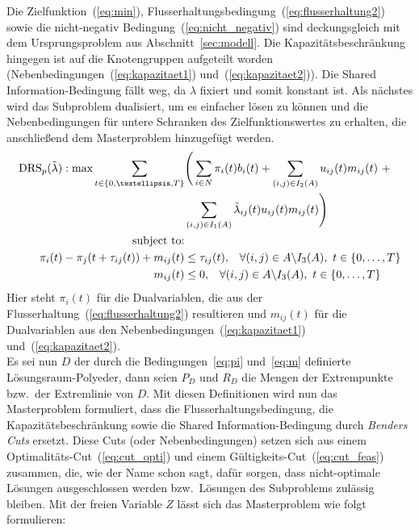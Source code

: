 \documentclass[a4paper, 11pt]{scrreprt}
\begin{document}
Die Zielfunktion~(\ref{eq:min}), Flusserhaltungsbedingung~(\ref{eq:flusserhaltung2}) sowie
die nicht-negativ Bedingung~(\ref{eq:nicht_negativ}) sind
deckungsgleich mit dem Ursprungsproblem aus Abschnitt~\ref{sec:modell}.
Die Kapazitätsbeschränkung hingegen ist auf die Knotengruppen aufgeteilt worden
(Nebenbedingungen~(\ref{eq:kapazitaet1}) und~(\ref{eq:kapazitaet2})).
Die Shared Information-Bedingung fällt weg, da $\lambda$ fixiert und somit konstant ist.
Als nächstes wird das Subproblem dualisiert, um es einfacher lösen zu können und die
Nebenbedingungen für untere Schranken des Zielfunktionswertes zu erhalten, die anschließend dem
Masterproblem hinzugefügt werden.
\begin{align}
  \text{DRS}_p(\tilde{\lambda}):\text{max} \sum_{t \in \{0,…,T\}}&\Bigg(\sum_{i \in N}\pi_i(t)b_i(t) + \sum_{(i,j)\in I_2(A)}u_{ij}(t)m_{ij}(t) \,\,+\notag\\ &\sum_{(i,j)\in I_1(A)} \tilde{\lambda}_{ij}(t) u_{ij}(t) m_{ij}(t)\Bigg)\\
  \text{subject to:}&\notag\\
  \pi_i(t) - \pi_j(t + \tau_{ij}(t)) + m_{ij}(t) &\leq \tau_{ij}(t), \,\,\,\,\, \forall (i, j) \in A \backslash I_3(A), \,\, t \in \{0,\dots,T\}\label{eq:pi}\\
  m_{ij}(t) &\leq 0, \,\,\,\,\, \forall (i, j) \in A \backslash I_3(A), \,\, t \in \{0,\dots,T\}\label{eq:m}
\end{align}
Hier steht $\pi_i(t)$ für die Dualvariablen, die aus der Flusserhaltung~(\ref{eq:flusserhaltung2}) resultieren
und $m_{ij}(t)$ für die Dualvariablen aus den Nebenbedingungen~(\ref{eq:kapazitaet1}) und~(\ref{eq:kapazitaet2}).\\
Es sei nun $D$ der durch die Bedingungen~\ref{eq:pi} und~\ref{eq:m} definierte Lösungsraum-Polyeder, dann
seien $P_D$ und $R_D$ die Mengen der Extrempunkte bzw.\ der Extremlinie von $D$.
Mit diesen Definitionen wird nun das Masterproblem formuliert, dass die Flusserhaltungsbedingung,
die Kapazitätsbeschränkung sowie die Shared Information-Bedingung durch \textit{Benders Cuts} ersetzt.
Diese Cuts (oder Nebenbedingungen) setzen sich aus einem Optimalitäts-Cut~(\ref{eq:cut_opti}) und einem
Gültigkeits-Cut~(\ref{eq:cut_feas}) zusammen, die, wie der Name schon sagt, dafür sorgen, dass
nicht-optimale Lösungen ausgeschlossen werden bzw.\ Lösungen des Subproblems zulässig bleiben.
Mit der freien Variable $Z$ lässt sich das Masterproblem wie folgt formulieren:
\end{document}
